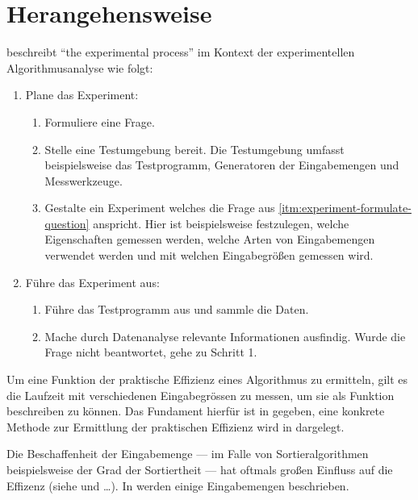 \chapter{Herangehensweise}

\cite[10]{mcg2012} beschreibt \enquote{the experimental process} im Kontext der experimentellen Algorithmusanalyse wie folgt:
\begin{enumerate}
    \item Plane das Experiment:
    \begin{enumerate}[label={(\alph*)}]
        \item Formuliere eine Frage.\label{itm:experiment-formulate-question}
        \item Stelle eine Testumgebung bereit. Die Testumgebung umfasst beispielsweise das Testprogramm, Generatoren der Eingabemengen und Messwerkzeuge.
        \item Gestalte ein Experiment welches die Frage aus \ref{itm:experiment-formulate-question} anspricht. Hier ist beispielsweise festzulegen, welche Eigenschaften gemessen werden, welche Arten von Eingabemengen verwendet werden und mit welchen Eingabegrößen gemessen wird.
    \end{enumerate}
    
    \item Führe das Experiment aus:
    \begin{enumerate}[label={\alph*}]
        \item Führe das Testprogramm aus und sammle die Daten.
        \item Mache durch Datenanalyse relevante Informationen ausfindig. Wurde die Frage nicht beantwortet, gehe zu Schritt 1.
    \end{enumerate}
\end{enumerate}

Um eine Funktion der  praktische Effizienz eines Algorithmus zu ermitteln, gilt es die Laufzeit mit verschiedenen Eingabegrössen zu messen, um sie als Funktion beschreiben zu können. Das Fundament hierfür ist in  gegeben, eine konkrete Methode zur Ermittlung der praktischen Effizienz wird in  dargelegt.

Die Beschaffenheit der Eingabemenge --- im Falle von Sortieralgorithmen beispielsweise der Grad der Sortiertheit --- hat oftmals großen Einfluss auf die Effizenz (siehe  und \ldots\nocit). In  werden einige Eingabemengen beschrieben.

